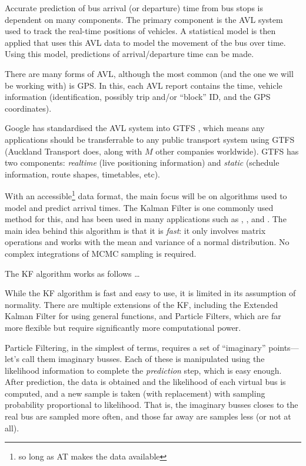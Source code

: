 \documentclass[12pt,a4paper]{article}
\begin{document}


Accurate prediction of bus arrival (or departure) time from bus stops is dependent on many components.
The primary component is the AVL system used to track the real-time positions of vehicles.
A statistical model is then applied that uses this AVL data to model the movement of the bus over time. 
Using this model, predictions of arrival/departure time can be made.


There are many forms of AVL, although the most common (and the one we will be working with) is GPS.
In this, each AVL report contains the time, vehicle information (identification, possibly trip and/or ``block'' ID,
and the GPS coordinates).

Google has standardised the AVL system into GTFS \cite{}, which means any applications should be transferrable to any 
public transport system using GTFS (Auckland Transport does, along with $M$ other companies worldwide).
GTFS has two components: \emph{realtime} (live positioning information) and \emph{static} (schedule information,
route shapes, timetables, etc).


With an accessible\footnote{so long as AT makes the data available} data format, the main focus will be on algorithms
used to model and predict arrival times. The Kalman Filter is one commonly used method for this, and has been used
in many applications such as \cite{cathey-dailey:2003}, \cite{}, and \cite{}.
The main idea behind this algorithm is that it is \emph{fast}: it only involves matrix operations and works with 
the mean and variance of a normal distribution.
No complex integrations of MCMC sampling is required.


The KF algorithm works as follows \ldots

While the KF algorithm is fast and easy to use, it is limited in its assumption of normality. 
There are multiple extensions of the KF, including the Extended Kalman Filter for using general functions, 
and Particle Filters, which are far more flexible but require significantly more computational power.


Particle Filtering, in the simplest of terms, requires a set of ``imaginary'' points---let's call them imaginary busses.
Each of these is manipulated using the likelihood information to complete the \emph{prediction} step,
which is easy enough.
After prediction, the data is obtained and the likelihood of each virtual bus is computed,
and a new sample is taken (with replacement) with sampling probability proportional to likelihood.
That is, the imaginary busses closes to the real bus are sampled more often, 
and those far away are samples less (or not at all).
\end{document}
